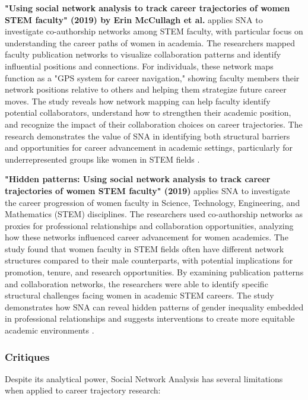 \documentclass[../main.tex]{subfiles}
\begin{document}
\textbf{"Using social network analysis to track career trajectories of women STEM faculty" (2019) by Erin McCullagh et al.} applies SNA to investigate co-authorship networks among STEM faculty, with particular focus on understanding the career paths of women in academia. The researchers mapped faculty publication networks to visualize collaboration patterns and identify influential positions and connections. For individuals, these network maps function as a "GPS system for career navigation," showing faculty members their network positions relative to others and helping them strategize future career moves. The study reveals how network mapping can help faculty identify potential collaborators, understand how to strengthen their academic position, and recognize the impact of their collaboration choices on career trajectories. The research demonstrates the value of SNA in identifying both structural barriers and opportunities for career advancement in academic settings, particularly for underrepresented groups like women in STEM fields \citep{mccullagh_women_stem}.

\textbf{"Hidden patterns: Using social network analysis to track career trajectories of women STEM faculty" (2019)} applies SNA to investigate the career progression of women faculty in Science, Technology, Engineering, and Mathematics (STEM) disciplines. The researchers used co-authorship networks as proxies for professional relationships and collaboration opportunities, analyzing how these networks influenced career advancement for women academics. The study found that women faculty in STEM fields often have different network structures compared to their male counterparts, with potential implications for promotion, tenure, and research opportunities. By examining publication patterns and collaboration networks, the researchers were able to identify specific structural challenges facing women in academic STEM careers. The study demonstrates how SNA can reveal hidden patterns of gender inequality embedded in professional relationships and suggests interventions to create more equitable academic environments \citep{mccullagh_hidden_patterns}.

\subsubsection{Critiques}

Despite its analytical power, Social Network Analysis has several limitations when applied to career trajectory research:
\end{document}
